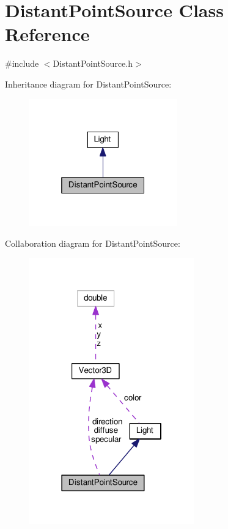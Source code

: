 \hypertarget{classDistantPointSource}{}\section{Distant\+Point\+Source Class Reference}
\label{classDistantPointSource}


{\ttfamily \#include $<$Distant\+Point\+Source.\+h$>$}



Inheritance diagram for Distant\+Point\+Source\+:\nopagebreak
\begin{figure}[H]
\begin{center}
\leavevmode
\includegraphics[width=181pt]{classDistantPointSource__inherit__graph}
\end{center}
\end{figure}


Collaboration diagram for Distant\+Point\+Source\+:\nopagebreak
\begin{figure}[H]
\begin{center}
\leavevmode
\includegraphics[width=202pt]{classDistantPointSource__coll__graph}
\end{center}
\end{figure}
